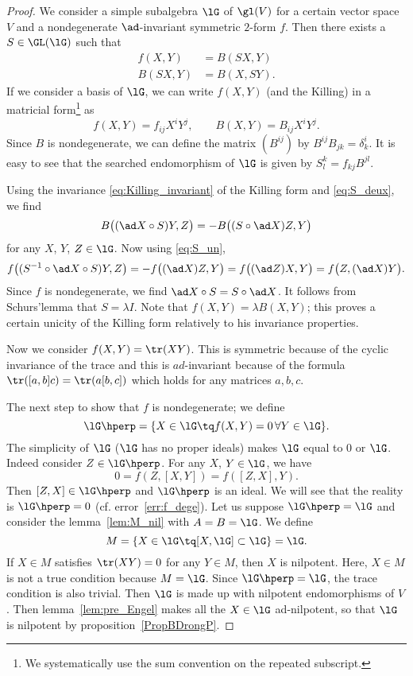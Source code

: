 \begin{proof}
    We consider a simple subalgebra $\lG$ of $\gl(V)$ for a certain vector space $V$ and a nondegenerate $\ad$-invariant symmetric $2$-form $f$. Then there exists a $S\in\GL(\lG)$ such that
    \begin{subequations}
    \begin{align}
      f(X,Y)&=B(SX,Y) \label{eq:S_un}  \\
      B(SX,Y)&=B(X,SY).  \label{eq:S_deux}
    \end{align}
    \end{subequations}
    If we consider a basis of $\lG$, we can write $f(X,Y)$ (and the Killing) in a matricial form\footnote{We systematically use the sum convention on the repeated subscript.} as
    \[
      f(X,Y)=f_{ij}X^iY^j,\qquad B(X,Y)=B_{ij}X^iY^j.
    \]
    Since $B$ is nondegenerate, we can define the matrix $(B^{ij})$ by $B^{ij}B_{jk}=\delta^i_k$. It is easy to see that the searched endomorphism of $\lG$ is given by $S^k_l=f_{kj}B^{jl}$.

    Using the invariance \eqref{eq:Killing_invariant} of the Killing form and \eqref{eq:S_deux}, we find
    \[
       B\big( (\ad X\circ S)Y,Z  \big)=-B\big( (S\circ\ad X)Z,Y  \big)
    \]
    for any $X$, $Y$, $Z\in\lG$. Now using \eqref{eq:S_un},
    \begin{equation}
     f\big(  (S^{-1}\circ\ad X\circ S)Y,Z  \big)=-f\big((\ad X) Z,Y\big)
                                               =f\big( (\ad Z) X,Y \big)
                           =f\big( Z, (\ad X)Y \big).
    \end{equation}
    Since $f$ is nondegenerate, we find $\ad X\circ S=S\circ\ad X$. It follows from Schurs'lemma that $S=\lambda I$. Note that $f(X,Y)=\lambda B(X,Y)$; this proves a certain unicity of the Killing form relatively to his invariance properties.

    Now we consider $f(X,Y)=\tr(XY)$. This is symmetric because of the cyclic invariance of the trace and this is $ad$-invariant because of the formula $\tr([a,b]c)=\tr(a[b,c])$ which holds for any matrices $a,b,c$.

    The next step to show that $f$ is nondegenerate; we define
    \[
      \lG\hperp=\{X\in\lG\tq f(X,Y)=0\,\forall Y\in\lG   \}.
    \]
    The simplicity of $\lG$ ($\lG$ has no proper ideals) makes $\lG$ equal to $0$ or $\lG$. Indeed consider $Z\in\lG\hperp$. For any $X$, $Y\in\lG$, we have
    \[
    0=f(Z,[X,Y])=f([Z,X],Y).
    \]
    Then $[Z,X]\in\lG\hperp$ and $\lG\hperp$ is an ideal. We will see that the reality is $\lG\hperp=0$ (cf. error~\ref{err:f_dege}). Let us suppose $\lG\hperp=\lG$ and consider the lemma~\ref{lem:M_nil} with $A=B=\lG$. We define
    \[
       M=\{ X\in\lG\tq [X,\lG]\subset\lG \}=\lG.
    \]
    If $X\in M$ satisfies $\tr(XY)=0$ for any $Y\in M$, then $X$ is nilpotent. Here, $X\in M$ is not a true condition because $M=\lG$. Since $\lG\hperp=\lG$, the trace condition is also trivial. Then $\lG$ is made up with nilpotent endomorphisms of $V$. Then lemma~\ref{lem:pre_Engel} makes all the $X\in\lG$ ad-nilpotent, so that $\lG$ is nilpotent by proposition~\ref{PropBDrongP}.


\end{proof}
